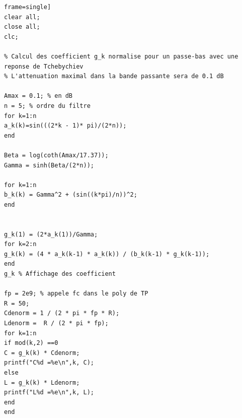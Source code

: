 \documentclass[french]{article}
\begin{document}
\begin{lstlisting}frame=single] 
clear all;
close all;
clc;

% Calcul des coefficient g_k normalise pour un passe-bas avec une reponse de Tchebychiev
% L'attenuation maximal dans la bande passante sera de 0.1 dB

Amax = 0.1; % en dB
n = 5; % ordre du filtre
for k=1:n
a_k(k)=sin(((2*k - 1)* pi)/(2*n));
end

Beta = log(coth(Amax/17.37));
Gamma = sinh(Beta/(2*n));

for k=1:n   
b_k(k) = Gamma^2 + (sin((k*pi)/n))^2;
end


g_k(1) = (2*a_k(1))/Gamma;
for k=2:n
g_k(k) = (4 * a_k(k-1) * a_k(k)) / (b_k(k-1) * g_k(k-1));
end
g_k % Affichage des coefficient

fp = 2e9; % appele fc dans le poly de TP
R = 50;
Cdenorm = 1 / (2 * pi * fp * R);
Ldenorm =  R / (2 * pi * fp);
for k=1:n
if mod(k,2) ==0
C = g_k(k) * Cdenorm;
printf("C%d =%e\n",k, C);
else
L = g_k(k) * Ldenorm;
printf("L%d =%e\n",k, L);
end
end


\end{lstlisting}
\end{document}
